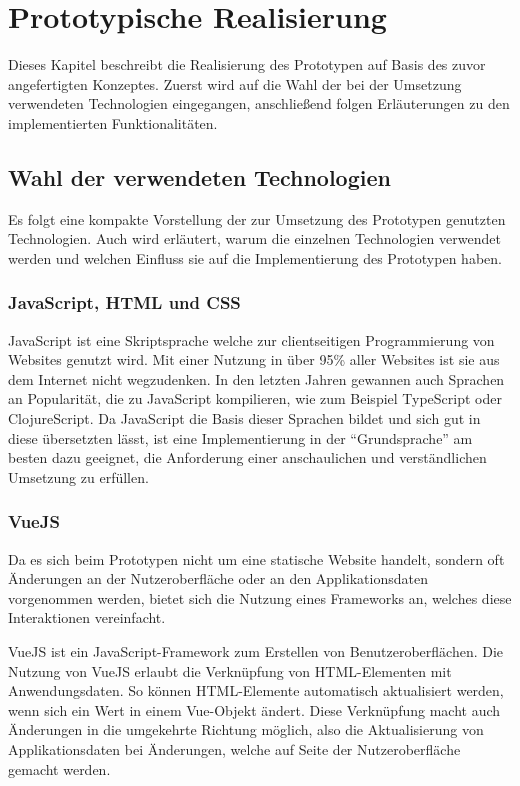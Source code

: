 \documentclass[a4paper, 12pt]{scrreprt}
\begin{document}
\chapter{Prototypische Realisierung}

Dieses Kapitel beschreibt die Realisierung des Prototypen auf Basis des zuvor angefertigten Konzeptes. Zuerst wird auf die Wahl der bei der Umsetzung verwendeten Technologien eingegangen, anschließend folgen Erläuterungen zu den implementierten Funktionalitäten.

\section{Wahl der verwendeten Technologien}
\label{sec:Technologien}
Es folgt eine kompakte Vorstellung der zur Umsetzung des Prototypen genutzten Technologien. Auch wird erläutert, warum die einzelnen Technologien verwendet werden und welchen Einfluss sie auf die Implementierung des Prototypen haben.

\subsection{JavaScript, HTML und CSS}
JavaScript ist eine Skriptsprache welche zur clientseitigen Programmierung von Websites genutzt wird. Mit einer Nutzung in über 95\% \autocite{OnlineJavascriptDistr} aller Websites ist sie aus dem Internet nicht wegzudenken. In den letzten Jahren gewannen auch Sprachen an Popularität, die zu JavaScript kompilieren, wie zum Beispiel TypeScript oder ClojureScript. Da JavaScript die Basis dieser Sprachen bildet und sich gut in diese übersetzten lässt, ist eine Implementierung in der \enquote{Grundsprache} am besten dazu geeignet, die Anforderung einer anschaulichen und verständlichen Umsetzung zu erfüllen.
\subsection{VueJS}
\label{sec:vue}
Da es sich beim Prototypen nicht um eine statische Website handelt, sondern oft Änderungen an der Nutzeroberfläche oder an den Applikationsdaten vorgenommen werden, bietet sich die Nutzung eines Frameworks an, welches diese Interaktionen vereinfacht. 

VueJS ist ein JavaScript-Framework zum Erstellen von Benutzeroberflächen. Die Nutzung von VueJS erlaubt die Verknüpfung von HTML-Elementen mit Anwendungsdaten. So können HTML-Elemente automatisch aktualisiert werden, wenn sich ein Wert in einem Vue-Objekt ändert. Diese Verknüpfung macht auch Änderungen in die umgekehrte Richtung möglich, also die Aktualisierung von Applikationsdaten bei Änderungen, welche auf Seite der Nutzeroberfläche gemacht werden.
\end{document}
